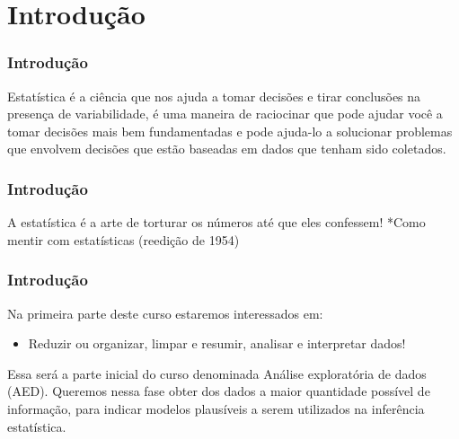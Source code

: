 \documentclass[12pt]{beamer}
\begin{document}
\section{Introdução}
\begin{frame}{}
\frametitle{Introdução}
\begin{block}{}
\justifying
Estatística é a ciência que nos ajuda a tomar decisões e tirar conclusões na presença de variabilidade, é uma maneira de raciocinar que pode ajudar você a tomar decisões mais bem fundamentadas e pode ajuda-lo a solucionar problemas que envolvem decisões que estão baseadas em dados que tenham sido coletados.
\end{block}
\end{frame}

\begin{frame}{}
\frametitle{Introdução}
\begin{block}{}
\justifying
A estatística é a arte de torturar os números até que eles confessem!
*Como mentir com estatísticas \cite{huff2016mentir} (reedição de 1954)
\end{block}
\end{frame}

\begin{frame}{}
\frametitle{Introdução}
\begin{block}{}
\justifying
Na primeira parte deste curso estaremos interessados em:
\begin{itemize}
\item Reduzir ou organizar, limpar e resumir, analisar e interpretar dados!
\end{itemize}
\end{block}
\pause
\begin{block}{}
\justifying
Essa será a parte inicial do curso denominada Análise exploratória de dados (AED). Queremos nessa fase obter dos dados a maior
quantidade possível de informação, para indicar modelos plausíveis a serem utilizados
na inferência estatística.
\end{block}
\end{frame}
\end{document}
